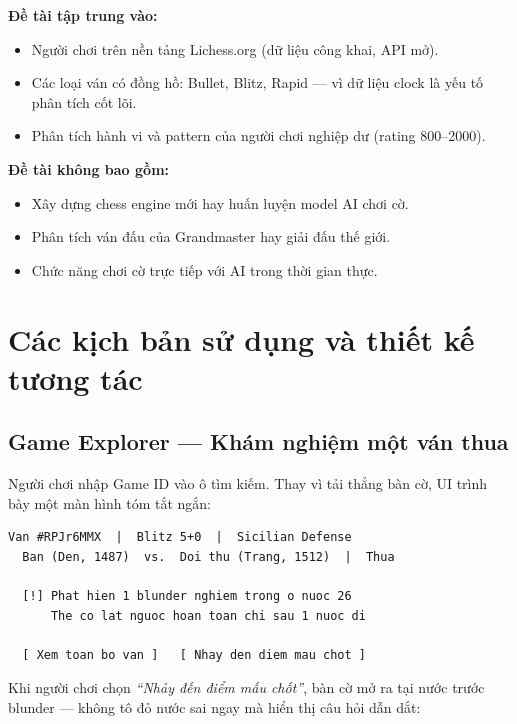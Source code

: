 \documentclass[14pt,a4paper]{extarticle}
\begin{document}
\textbf{Đề tài tập trung vào:}
\begin{itemize}
  \item Người chơi trên nền tảng Lichess.org (dữ liệu công khai, API mở).
  \item Các loại ván có đồng hồ: Bullet, Blitz, Rapid --- vì dữ liệu clock là
    yếu tố phân tích cốt lõi.
  \item Phân tích hành vi và pattern của người chơi nghiệp dư (rating
    800--2000).
\end{itemize}

\textbf{Đề tài không bao gồm:}
\begin{itemize}
  \item Xây dựng chess engine mới hay huấn luyện model AI chơi cờ.
  \item Phân tích ván đấu của Grandmaster hay giải đấu thế giới.
  \item Chức năng chơi cờ trực tiếp với AI trong thời gian thực.
\end{itemize}

\section{Các kịch bản sử dụng và thiết kế tương tác}

\subsection{Game Explorer --- Khám nghiệm một ván thua}

Người chơi nhập Game ID vào ô tìm kiếm. Thay vì tải thẳng bàn cờ, UI trình
bày một màn hình tóm tắt ngắn:

\begin{uibox}
\begin{Verbatim}[fontsize=\small]
  Van #RPJr6MMX  |  Blitz 5+0  |  Sicilian Defense
  Ban (Den, 1487)  vs.  Doi thu (Trang, 1512)  |  Thua

  [!] Phat hien 1 blunder nghiem trong o nuoc 26
      The co lat nguoc hoan toan chi sau 1 nuoc di

  [ Xem toan bo van ]   [ Nhay den diem mau chot ]
\end{Verbatim}
\end{uibox}

Khi người chơi chọn \textit{``Nhảy đến điểm mấu chốt''}, bàn cờ mở ra tại
nước trước blunder --- không tô đỏ nước sai ngay mà hiển thị câu hỏi dẫn dắt:
\end{document}
